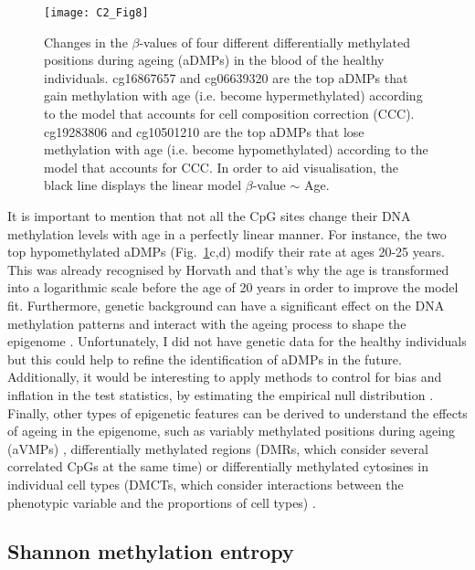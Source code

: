 \begin{figure}[htbp!] 
	\centering    
	\texttt{[image: C2\_Fig8]}
	\caption[Changes in the $\beta$-values of four different aDMPs]{Changes in the $\beta$-values of four different differentially methylated positions during ageing (aDMPs) in the blood of the healthy individuals. cg16867657 and cg06639320 are the top aDMPs that gain methylation with age (i.e. become hypermethylated) according to the model that accounts for cell composition correction (CCC). cg19283806 and cg10501210 are the top aDMPs that lose methylation with age (i.e. become hypomethylated) according to the model that accounts for CCC. In order to aid visualisation, the black line displays the linear model $\beta$-value $\sim$ Age.}
	\label{fig:c2_fig8}
\end{figure}

\bigskip

It is important to mention that not all the CpG sites change their DNA methylation levels with age in a perfectly linear manner. For instance, the two top hypomethylated aDMPs (Fig.~\ref{fig:c2_fig8}c,d) modify their rate at ages 20-25 years. This was already recognised by Horvath \cite{Horvath2013} and that's why the age is transformed into a logarithmic scale before the age of 20 years in order to improve the model fit. Furthermore, genetic background can have a significant effect on the DNA methylation patterns and interact with the ageing process to shape the epigenome \cite{VanDongen2016,Hannum2013}. Unfortunately, I did not have genetic data for the healthy individuals but this could help to refine the identification of aDMPs in the future. Additionally, it would be interesting to apply methods to control for bias and inflation in the test statistics, by estimating the empirical null distribution \cite{VanIterson2017}. Finally, other types of epigenetic features can be derived to understand the effects of ageing in the epigenome, such as variably methylated positions during ageing (\acrshort{aVMPs}) \cite{Slieker2016}, differentially methylated regions (\acrshort{DMRs}, which consider several correlated CpGs at the same time) \cite{Teschendorff2018} or differentially methylated cytosines in individual cell types (\acrshort{DMCTs}, which consider interactions between the phenotypic variable and the proportions of cell types) \cite{Zheng2018}.


\smallskip

\subsection{Shannon methylation entropy}

